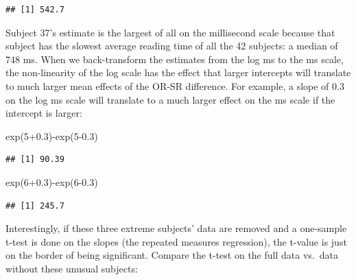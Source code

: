 \documentclass[
  12pt,
]{krantz}
\newenvironment{Shaded}{\begin{snugshade}}{\end{snugshade}}
\newcommand{\DecValTok}[1]{\textcolor[rgb]{0.00,0.00,0.81}{#1}}
\newcommand{\DocumentationTok}[1]{\textcolor[rgb]{0.56,0.35,0.01}{\textbf{\textit{#1}}}}
\newcommand{\FloatTok}[1]{\textcolor[rgb]{0.00,0.00,0.81}{#1}}
\newcommand{\FunctionTok}[1]{\textcolor[rgb]{0.00,0.00,0.00}{#1}}
\newcommand{\NormalTok}[1]{#1}
\newcommand{\SpecialCharTok}[1]{\textcolor[rgb]{0.00,0.00,0.00}{#1}}
\theoremstyle{definition}
\theoremstyle{definition}
\theoremstyle{definition}
\theoremstyle{definition}
\theoremstyle{remark}
\begin{document}
\begin{verbatim}
## [1] 542.7
\end{verbatim}

Subject 37's estimate is the largest of all on the millisecond scale because that subject has the slowest average reading time of all the 42 subjects: a median of 748 ms. When we back-transform the estimates from the log ms to the ms scale, the non-linearity of the log scale has the effect that larger intercepts will translate to much larger mean effects of the OR-SR difference. For example, a slope of 0.3 on the log ms scale will translate to a much larger effect on the ms scale if the intercept is larger:

\begin{Shaded}
\begin{Highlighting}[]
\FunctionTok{exp}\NormalTok{(}\DecValTok{5}\FloatTok{+0.3}\NormalTok{)}\SpecialCharTok{{-}}\FunctionTok{exp}\NormalTok{(}\DecValTok{5}\FloatTok{{-}0.3}\NormalTok{)}
\end{Highlighting}
\end{Shaded}

\begin{verbatim}
## [1] 90.39
\end{verbatim}

\begin{Shaded}
\begin{Highlighting}[]
\FunctionTok{exp}\NormalTok{(}\DecValTok{6}\FloatTok{+0.3}\NormalTok{)}\SpecialCharTok{{-}}\FunctionTok{exp}\NormalTok{(}\DecValTok{6}\FloatTok{{-}0.3}\NormalTok{)}
\end{Highlighting}
\end{Shaded}

\begin{verbatim}
## [1] 245.7
\end{verbatim}

Interestingly, if these three extreme subjects' data are removed and a one-sample t-test is done on the slopes (the repeated measures regression), the t-value is just on the border of being significant. Compare the t-test on the full data vs.~data without these unusual subjects:

\begin{Shaded}
\end{Shaded}
\end{document}
